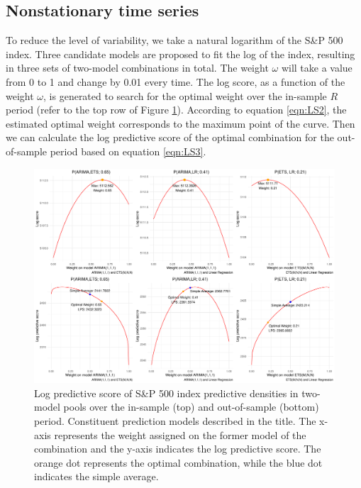\documentclass{monashthesis}
\begin{document}
\hypertarget{nonstationary-time-series}{%
\subsection{Nonstationary time series}\label{nonstationary-time-series}}

To reduce the level of variability, we take a natural logarithm of the S\&P 500 index. Three candidate models are proposed to fit the log of the index, resulting in three sets of two-model combinations in total. The weight \(\omega\) will take a value from 0 to 1 and change by 0.01 every time. The log score, as a function of the weight \(\omega\), is generated to search for the optimal weight over the in-sample \(R\) period (refer to the top row of Figure \ref{fig:nonstat}). According to equation \ref{eqn:LS2}, the estimated optimal weight corresponds to the maximum point of the curve. Then we can calculate the log predictive score of the optimal combination for the out-of-sample period based on equation \ref{eqn:LS3}.

\begin{figure}[ht]
\centering
\includegraphics[scale=0.45]{figures/SP500_nonstationary.pdf}
\caption{Log predictive score of S\&P 500 index predictive densities in two-model pools over the in-sample (top) and out-of-sample (bottom) period. Constituent prediction models described in the title. The x-axis represents the weight assigned on the former model of the combination and the y-axis indicates the log predictive score. The orange dot represents the optimal combination, while the blue dot indicates the simple average.}
\label{fig:nonstat}
\end{figure}
\end{document}
